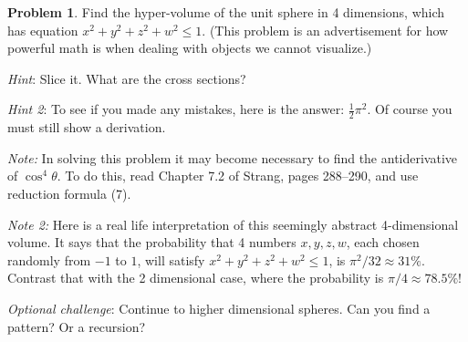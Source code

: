 \documentclass[11pt,oneside]{amsart}
\theoremstyle{definition}
\newtheorem{problem}{Problem}
\begin{document}
    \begin{problem}
        Find the hyper-volume of the unit sphere in 4 dimensions, which has equation $x^2+y^2+z^2+w^2\leq 1$. (This problem is an advertisement for how powerful math is when dealing with objects we cannot visualize.)

        \emph{Hint}: Slice it. What are the cross sections?

        \emph{Hint 2}: To see if you made any mistakes, here is the answer: $\frac12\pi^2$. Of course you must still show a derivation.

        \emph{Note:} In solving this problem it may become necessary to find the antiderivative of $\cos^4\theta$. To do this, read Chapter 7.2 of Strang, pages 288--290, and use reduction formula (7).

        \emph{Note 2:} Here is a real life interpretation of this seemingly abstract 4-dimensional volume. It says that the probability that 4 numbers $x,y,z,w$, each chosen randomly from $-1$ to $1$, will satisfy $x^2+y^2+z^2+w^2\leq 1$, is $\pi^2/32\approx 31\%$. Contrast that with the 2 dimensional case, where the probability is $\pi/4\approx 78.5\%$!

        \emph{Optional challenge}: Continue to higher dimensional spheres. Can you find a pattern? Or a recursion?
    \end{problem}
\end{document}
